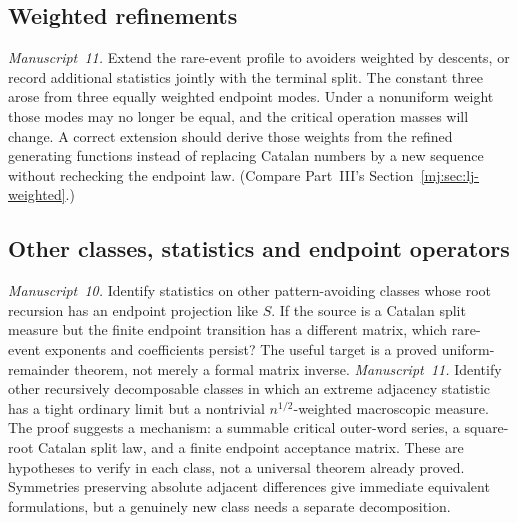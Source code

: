 \documentclass[11pt,a4paper]{article}
\theoremstyle{definition}\newaliascnt{definition}{theorem}
\theoremstyle{remark}\newaliascnt{remark}{theorem}
\begin{document}
\subsection{Weighted refinements}
\emph{Manuscript~11.} Extend the rare-event profile to avoiders weighted by
descents, or record additional statistics jointly with the terminal split.
The constant three arose from three equally weighted endpoint modes. Under a
nonuniform weight those modes may no longer be equal, and the critical
operation masses will change. A correct extension should derive those weights
from the refined generating functions instead of replacing Catalan numbers by
a new sequence without rechecking the endpoint law. (Compare Part~III's
Section~\ref{mj:sec:lj-weighted}.)

\subsection{Other classes, statistics and endpoint operators}
\emph{Manuscript~10.} Identify statistics on other pattern-avoiding classes
whose root recursion has an endpoint projection like $S$. If the source is a
Catalan split measure but the finite endpoint transition has a different
matrix, which rare-event exponents and coefficients persist? The useful
target is a proved uniform-remainder theorem, not merely a formal matrix
inverse. \emph{Manuscript~11.} Identify other recursively decomposable
classes in which an extreme adjacency statistic has a tight ordinary limit
but a nontrivial $n^{1/2}$-weighted macroscopic measure. The proof suggests a
mechanism: a summable critical outer-word series, a square-root Catalan split
law, and a finite endpoint acceptance matrix. These are hypotheses to verify
in each class, not a universal theorem already proved. Symmetries preserving
absolute adjacent differences give immediate equivalent formulations, but a
genuinely new class needs a separate decomposition.
\end{document}
